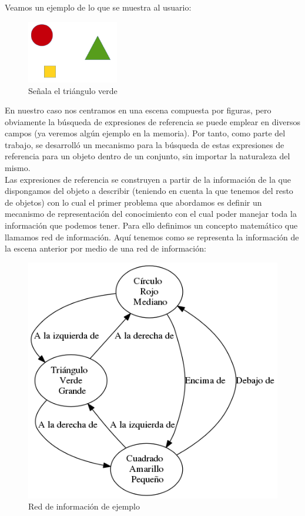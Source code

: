 \documentclass[10pt,a4paper]{article}
\begin{document}
Veamos un ejemplo de lo que se muestra al usuario:

\begin{figure}[h]
\centering
\includegraphics[width=40mm]{img/ejemplo1.png}
\caption{Señala el triángulo verde} \label{Escena de ejemplo}
\end{figure}

En nuestro caso nos centramos en una escena compuesta por figuras, pero obviamente la búsqueda de expresiones de referencia se puede emplear en diversos campos (ya veremos algún ejemplo en la memoria). Por tanto, como parte del trabajo, se desarrolló un mecanismo para la búsqueda de estas expresiones de referencia para un objeto dentro de un conjunto, sin importar la naturaleza del mismo.\\

Las expresiones de referencia se construyen a partir de la información de la que dispongamos del objeto a describir (teniendo en cuenta la que tenemos del resto de objetos) con lo cual el primer problema que abordamos es definir un mecanismo de representación del conocimiento con el cual poder manejar toda la información que podemos tener. Para ello definimos un concepto matemático que llamamos red de información. Aquí tenemos como se representa la información de la escena anterior por medio de una red de información:

\begin{figure}[h]
\centering
\includegraphics[scale=0.5]{img/RIejemplo1.png}
\caption{Red de información de ejemplo} \label{RI ejemplo}
\end{figure}
\end{document}
